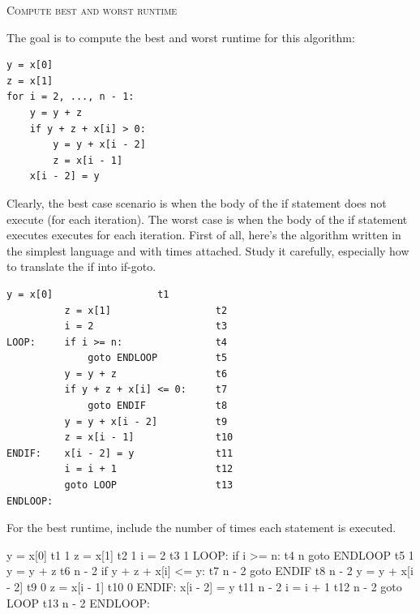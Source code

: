 

\LATEXHELPTHREEFIVEZERO

\TURNPAGE

\newpage
\textsc{Compute best and worst runtime}

The goal is to compute the best and worst runtime for this algorithm:
\begin{Verbatim}[frame=single,fontsize=\small]
y = x[0]
z = x[1]
for i = 2, ..., n - 1:
    y = y + z
    if y + z + x[i] > 0:
        y = y + x[i - 2]
        z = x[i - 1]
    x[i - 2] = y
\end{Verbatim}
Clearly, the best case scenario is when the body of the if statement does not
execute
(for each iteration).
The worst case is when the body of the if statement executes executes
for each iteration.
First of all, here's the algorithm written in the simplest language
and with times attached.
Study it carefully, especially how to translate the if into
if-goto.
\begin{Verbatim}[frame=single,fontsize=\small]
          y = x[0]                  t1          
          z = x[1]                  t2
          i = 2                     t3
LOOP:     if i >= n:                t4
              goto ENDLOOP          t5
          y = y + z                 t6
          if y + z + x[i] <= 0:     t7
              goto ENDIF            t8
          y = y + x[i - 2]          t9
          z = x[i - 1]              t10
ENDIF:    x[i - 2] = y              t11
          i = i + 1                 t12
          goto LOOP                 t13
ENDLOOP:
\end{Verbatim}

\TURNPAGE
\newpage

\nextq
For the best runtime,
include the number of times each statement is executed.
\\
\ANSWER
\begin{answercode}
          y = x[0]                  t1    1
          z = x[1]                  t2    1
          i = 2                     t3    1
LOOP:     if i >= n:                t4    n
              goto ENDLOOP          t5    1
          y = y + z                 t6    n - 2
          if y + z + x[i] <= y:     t7    n - 2
              goto ENDIF            t8    n - 2
          y = y + x[i - 2]          t9    0
          z = x[i - 1]              t10   0
ENDIF:    x[i - 2] = y              t11   n - 2
          i = i + 1                 t12   n - 2
          goto LOOP                 t13   n - 2
ENDLOOP:
\end{answercode}

